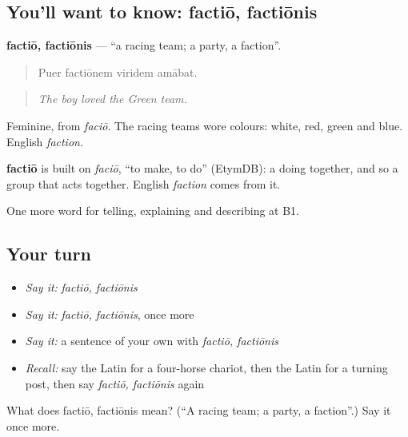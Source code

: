 \subsection*{You'll want to know: factiō, factiōnis}
\textbf{factiō, factiōnis} — \textquotedblleft{}a racing team; a party, a faction\textquotedblright{}.

\begin{quote}
Puer factiōnem viridem amābat.
\end{quote}

\begin{quote}
\emph{The boy loved the Green team.}
\end{quote}

Feminine, from \emph{faciō}. The racing teams wore colours: white, red, green and blue. English \emph{faction}.

\begin{cousinweb}
\textbf{factiō} is built on \emph{faciō}, \textquotedblleft{}to make, to do\textquotedblright{} (EtymDB): a doing together, and so a group that acts together. English \emph{faction} comes from it.
\end{cousinweb}

\begin{grammarlens}[title={What you've built}]
One more word for telling, explaining and describing at B1.
\end{grammarlens}

\subsection*{Your turn}
\begin{itemize}
\raggedright
  \item \emph{Say it:} \emph{factiō, factiōnis}
  \item \emph{Say it:} \emph{factiō, factiōnis}, once more
  \item \emph{Say it:} a sentence of your own with \emph{factiō, factiōnis}
  \item \emph{Recall:} say the Latin for a four-horse chariot, then the Latin for a turning post, then say \emph{factiō, factiōnis} again
\end{itemize}

\begin{tcolorbox}[breakable,colback=teal!4,colframe=teal!35!black,title={Before you move on}]
What does factiō, factiōnis mean? (\textquotedblleft{}A racing team; a party, a faction\textquotedblright{}.) Say it once more.
\end{tcolorbox}
